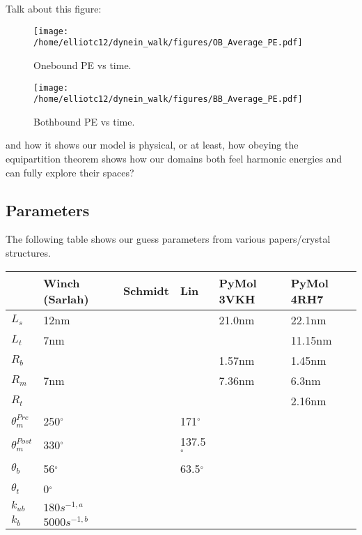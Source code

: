 \documentclass[10pt]{article} %
\begin{document}
Talk about this figure:

\begin{figure}[h!]
  \centering

  \begin{minipage}[b]{0.49\textwidth}
    \texttt{[image: /home/elliotc12/dynein\_walk/figures/OB\_Average\_PE.pdf]}
    \caption{Onebound PE vs time.}
  \end{minipage}
  \begin{minipage}[b]{0.49\textwidth}
    \texttt{[image: /home/elliotc12/dynein\_walk/figures/BB\_Average\_PE.pdf]}
    \caption{Bothbound PE vs time.}
  \end{minipage}
  \label{fig:equipartition_agreement}
\end{figure}

and how it shows our model is physical, or at least, how obeying the equipartition theorem shows
how our domains both feel harmonic energies and can fully explore their spaces?\\

\subsection{Parameters}
The following table shows our guess parameters from various papers/crystal structures.\\
                        
                        \begin{center}
  \begin{tabular}{| l | l | l | l | l | l |}
    \hline
    & Winch (Sarlah) & Schmidt & Lin & PyMol 3VKH & PyMol 4RH7\\\hline
    $L_s$ & 12nm & & & 21.0nm & 22.1nm\\ \hline
    $L_t$ &  7nm & & & & 11.15nm\\ \hline
    $R_b$ &  & & & 1.57nm & 1.45nm\\ \hline
    $R_m$ &  7nm & & & 7.36nm & 6.3nm\\ \hline
    $R_t$ &  & & & & 2.16nm \\ \hline
    $\theta_{m}^{Pre}$ & 250$^{\circ}$ & & 171$^{\circ}$ & &\\ \hline
    $\theta_{m}^{Post}$ & 330$^{\circ}$ & & 137.5$^{\circ}$ & &\\ \hline
    $\theta_{b}$ & 56$^{\circ}$ & & 63.5$^{\circ}$ & &\\ \hline
    $\theta_{t}$ & 0$^{\circ}$ & & & &\\ \hline
    $k_{ub}$ & $180 s^{-1,a}$ & & & &\\ \hline
    $k_b$ & $5000 s^{-1,b}$ & & & &\\ \hline
  \end{tabular}
\end{center}
\end{document}
